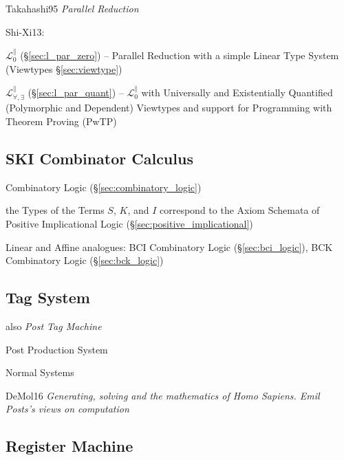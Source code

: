 
Takahashi95 \emph{Parallel Reduction}

Shi-Xi13:

\fist $\mathcal{L}^\parallel_0$ (\S\ref{sec:l_par_zero}) --
Parallel Reduction with a simple Linear Type System (Viewtypes
\S\ref{sec:viewtype})

\fist $\mathcal{L}^\parallel_{\forall,\exists}$
(\S\ref{sec:l_par_quant}) -- $\mathcal{L}^\parallel_0$ with
Universally and Existentially Quantified (Polymorphic and Dependent)
Viewtypes and support for Programming with Theorem Proving (PwTP)



\subsection{SKI Combinator Calculus}\label{sec:ski_calculus}

Combinatory Logic (\S\ref{sec:combinatory_logic})

the Types of the Terms $S$, $K$, and $I$ correspond to the Axiom
Schemata of Positive Implicational Logic
(\S\ref{sec:positive_implicational})

Linear and Affine analogues: BCI Combinatory Logic
(\S\ref{sec:bci_logic}), BCK Combinatory Logic (\S\ref{sec:bck_logic})



\subsection{Tag System}\label{sec:tag_system}

also \emph{Post Tag Machine}

Post Production System %

Normal Systems

DeMol16 \emph{Generating, solving and the mathematics of Homo Sapiens.
  Emil Posts's views on computation}



\subsection{Register Machine}\label{sec:register_machine}

